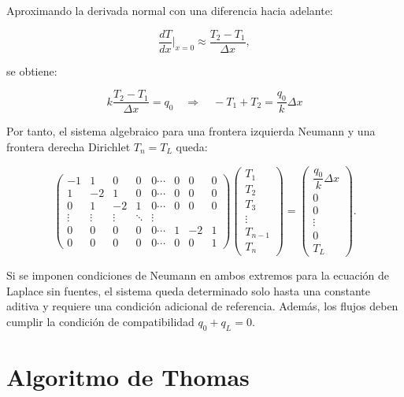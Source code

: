 \documentclass[11pt,a4paper]{article}
\begin{document}
Aproximando la derivada normal con una diferencia hacia adelante:

\begin{equation}
\frac{dT}{dx}\bigg|_{x=0} \approx \frac{T_2-T_1}{\Delta x},
\end{equation}

se obtiene:

\begin{equation}
k\frac{T_2-T_1}{\Delta x}=q_0
\quad \Rightarrow \quad
-T_1+T_2=\frac{q_0}{k} \Delta x
\end{equation}

Por tanto, el sistema algebraico para una frontera izquierda Neumann y una
frontera derecha Dirichlet $T_n=T_L$ queda:

\begin{equation}
\begin{pmatrix}
-1 & 1 & 0 & 0 & 0  \cdots & 0 & 0 & 0 \\
1 & -2 & 1 & 0 & 0  \cdots & 0 & 0 & 0 \\
0 & 1 & -2 & 1 & 0  \cdots & 0 & 0 & 0 \\
\vdots & \vdots & \vdots & \ddots & \vdots \\
0 & 0 & 0 & 0 & 0  \cdots & 1 & -2 & 1 \\
0 & 0 & 0 & 0 & 0  \cdots & 0 & 0 & 1
\end{pmatrix}
\begin{pmatrix}
T_1 \\
T_2 \\
T_3 \\
\vdots \\
T_{n-1} \\
T_n
\end{pmatrix}
=
\begin{pmatrix}
\dfrac{q_0}{k} \Delta x \\
0 \\
0 \\
\vdots \\
0 \\
T_L
\end{pmatrix}.
\end{equation}

Si se imponen condiciones de Neumann en ambos extremos para la ecuaci\'on de
Laplace sin fuentes, el sistema queda determinado solo hasta una constante
aditiva y requiere una condici\'on adicional de referencia. Adem\'as, los flujos
deben cumplir la condici\'on de compatibilidad $q_0+q_L=0$.

\section{Algoritmo de Thomas}
\end{document}
